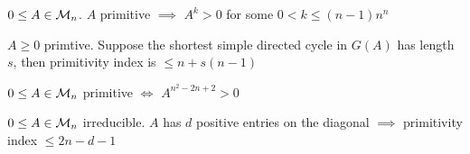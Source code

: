 \documentclass[aspectratio=43]{beamer}
\begin{document}
\begin{frame}
\begin{theorem}
$0\leq A\in \mathcal{M}_n$. $A$ primitive $\implies$ $A^k>0$ for some $0<k\leq (n-1)n^n$
\end{theorem}
\vfill
\begin{theorem}
$A\geq 0$ primtive. Suppose the shortest simple directed cycle in $G(A)$ has length $s$, then primitivity index is $\leq n+s(n-1)$
\end{theorem}
\vfill
\begin{theorem}
$0\leq A\in \mathcal{M}_n$ primitive $\iff$ $A^{n^2-2n+2}>0$
\end{theorem}
\vfill
\begin{theorem}
	$0\leq A\in \mathcal{M}_n$ irreducible. $A$ has $d$ positive entries on the diagonal $\implies$ primitivity index $\leq 2n-d-1$
\end{theorem}
\end{frame}
\end{document}
